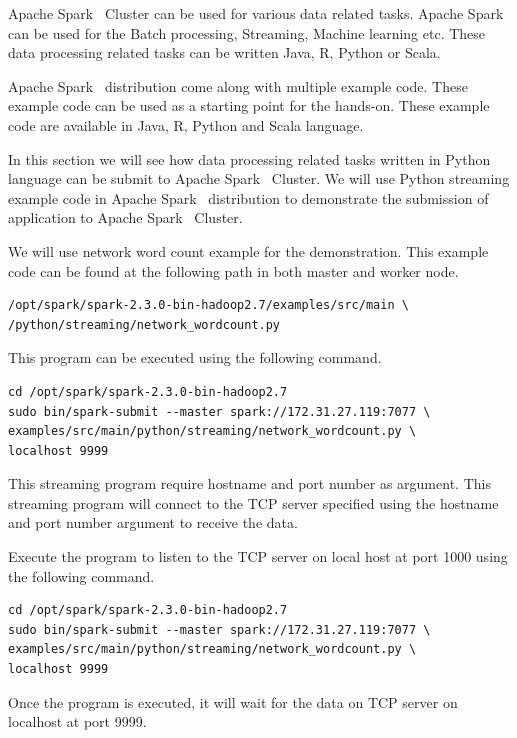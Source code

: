 Apache Spark~\cite{hid-sp18-511-www-spark} Cluster can be used for
various data related tasks.  Apache
Spark~\cite{hid-sp18-511-www-spark} can be used for the Batch
processing, Streaming, Machine learning etc. These data processing
related tasks can be written Java, R, Python or Scala.

Apache Spark~\cite{hid-sp18-511-www-spark} distribution come along
with multiple example code. These example code can be used as a
starting point for the hands-on. These example code are available in
Java, R, Python and Scala language.

In this section we will see how data processing related tasks written
in Python language can be submit to Apache
Spark~\cite{hid-sp18-511-www-spark} Cluster. We will use Python
streaming example code in Apache Spark~\cite{hid-sp18-511-www-spark}
distribution to demonstrate the submission of application to Apache
Spark~\cite{hid-sp18-511-www-spark} Cluster.

We will use network word count example for the demonstration. This
example code can be found at the following path in both master and
worker node.

\begin{verbatim}
/opt/spark/spark-2.3.0-bin-hadoop2.7/examples/src/main \
/python/streaming/network_wordcount.py
\end{verbatim}

This program can be executed using the following command.

\begin{verbatim}
cd /opt/spark/spark-2.3.0-bin-hadoop2.7
sudo bin/spark-submit --master spark://172.31.27.119:7077 \
examples/src/main/python/streaming/network_wordcount.py \
localhost 9999
\end{verbatim}

This streaming program require hostname and port number as
argument. This streaming program will connect to the TCP server
specified using the hostname and port number argument to receive the
data.

Execute the program to listen to the TCP server on local host at port
1000 using the following command.

\begin{verbatim}
cd /opt/spark/spark-2.3.0-bin-hadoop2.7
sudo bin/spark-submit --master spark://172.31.27.119:7077 \
examples/src/main/python/streaming/network_wordcount.py \
localhost 9999 
\end{verbatim}

Once the program is executed, it will wait for the data on TCP server
on localhost at port 9999.


